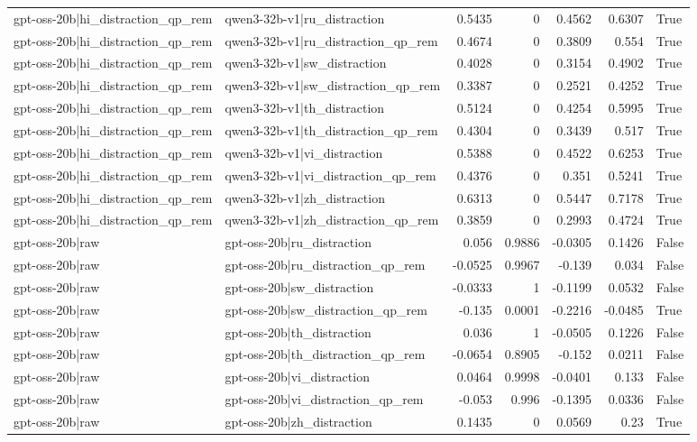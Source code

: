 \begin{table}
\begin{tabular}{l l r r r r l}
gpt-oss-20b|hi_distraction_qp_rem & qwen3-32b-v1|ru_distraction & 0.5435 & 0 & 0.4562 & 0.6307 & True \\
gpt-oss-20b|hi_distraction_qp_rem & qwen3-32b-v1|ru_distraction_qp_rem & 0.4674 & 0 & 0.3809 & 0.554 & True \\
gpt-oss-20b|hi_distraction_qp_rem & qwen3-32b-v1|sw_distraction & 0.4028 & 0 & 0.3154 & 0.4902 & True \\
gpt-oss-20b|hi_distraction_qp_rem & qwen3-32b-v1|sw_distraction_qp_rem & 0.3387 & 0 & 0.2521 & 0.4252 & True \\
gpt-oss-20b|hi_distraction_qp_rem & qwen3-32b-v1|th_distraction & 0.5124 & 0 & 0.4254 & 0.5995 & True \\
gpt-oss-20b|hi_distraction_qp_rem & qwen3-32b-v1|th_distraction_qp_rem & 0.4304 & 0 & 0.3439 & 0.517 & True \\
gpt-oss-20b|hi_distraction_qp_rem & qwen3-32b-v1|vi_distraction & 0.5388 & 0 & 0.4522 & 0.6253 & True \\
gpt-oss-20b|hi_distraction_qp_rem & qwen3-32b-v1|vi_distraction_qp_rem & 0.4376 & 0 & 0.351 & 0.5241 & True \\
gpt-oss-20b|hi_distraction_qp_rem & qwen3-32b-v1|zh_distraction & 0.6313 & 0 & 0.5447 & 0.7178 & True \\
gpt-oss-20b|hi_distraction_qp_rem & qwen3-32b-v1|zh_distraction_qp_rem & 0.3859 & 0 & 0.2993 & 0.4724 & True \\
gpt-oss-20b|raw & gpt-oss-20b|ru_distraction & 0.056 & 0.9886 & -0.0305 & 0.1426 & False \\
gpt-oss-20b|raw & gpt-oss-20b|ru_distraction_qp_rem & -0.0525 & 0.9967 & -0.139 & 0.034 & False \\
gpt-oss-20b|raw & gpt-oss-20b|sw_distraction & -0.0333 & 1 & -0.1199 & 0.0532 & False \\
gpt-oss-20b|raw & gpt-oss-20b|sw_distraction_qp_rem & -0.135 & 0.0001 & -0.2216 & -0.0485 & True \\
gpt-oss-20b|raw & gpt-oss-20b|th_distraction & 0.036 & 1 & -0.0505 & 0.1226 & False \\
gpt-oss-20b|raw & gpt-oss-20b|th_distraction_qp_rem & -0.0654 & 0.8905 & -0.152 & 0.0211 & False \\
gpt-oss-20b|raw & gpt-oss-20b|vi_distraction & 0.0464 & 0.9998 & -0.0401 & 0.133 & False \\
gpt-oss-20b|raw & gpt-oss-20b|vi_distraction_qp_rem & -0.053 & 0.996 & -0.1395 & 0.0336 & False \\
gpt-oss-20b|raw & gpt-oss-20b|zh_distraction & 0.1435 & 0 & 0.0569 & 0.23 & True \\

\end{tabular}
\end{table}
